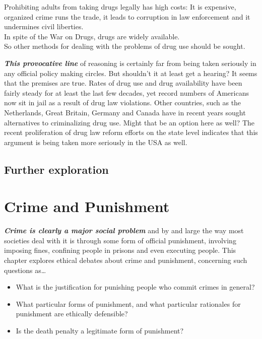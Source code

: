 \documentclass[
  12pt, openany]{book}
\makeatletter
\providecommand{\tightlist}{%
  \setlength{\itemsep}{0pt}\setlength{\parskip}{0pt}}
\newenvironment{kframe}{%
\medskip{}
\setlength{\fboxsep}{.8em}
 \def\at@end@of@kframe{}%
 \ifinner\ifhmode%
  \def\at@end@of@kframe{\end{minipage}}%
  \begin{minipage}{\columnwidth}%
 \fi\fi%
 \def\FrameCommand##1{\hskip\@totalleftmargin \hskip-\fboxsep
 \colorbox{shadecolor}{##1}\hskip-\fboxsep
     \hskip-\linewidth \hskip-\@totalleftmargin \hskip\columnwidth}%
 \MakeFramed {\advance\hsize-\width
   \@totalleftmargin\z@ \linewidth\hsize
   \@setminipage}}%
 {\par\unskip\endMakeFramed%
 \at@end@of@kframe}
\newenvironment{rmdblock}[1]
  {
  \begin{itemize}
  \renewcommand{\labelitemi}{
    \raisebox{-.7\height}[0pt][0pt]{
      {\setkeys{Gin}{width=3em,keepaspectratio}\texttt{[image: img/\#1]}}
    }
  }
  \setlength{\fboxsep}{1em}
  \begin{kframe}
  \item
  }
  {
  \end{kframe}
  \end{itemize}
  }
\newenvironment{question}
  {\begin{rmdblock}{question}}
  {\end{rmdblock}}
\theoremstyle{definition}
\theoremstyle{definition}
\theoremstyle{definition}
\theoremstyle{definition}
\theoremstyle{remark}
\makeatother
\begin{document}
\begin{center}

\begin{argument}
Prohibiting adults from taking drugs legally has high costs: It is expensive, organized crime runs the trade, it leads to corruption in law enforcement and it undermines civil liberties.\\
In spite of the War on Drugs, drugs are widely available.\\

So other methods for dealing with the problems of drug use should be sought.

\end{argument}


\end{center}

\textbf{\emph{This provocative line}} of reasoning is certainly far from being taken seriously in any official policy making circles. But shouldn't it at least get a hearing? It seems that the premises are true. Rates of drug use and drug availability have been fairly steady for at least the last few decades, yet record numbers of Americans now sit in jail as a result of drug law violations. Other countries, such as the Netherlands, Great Britain, Germany and Canada have in recent years sought alternatives to criminalizing drug use. Might that be an option here as well? The recent proliferation of drug law reform efforts on the state level indicates that this argument is being taken more seriously in the USA as well.

\hypertarget{further-exploration-8}{%
\section*{Further exploration}\label{further-exploration-8}}


\hypertarget{crime-and-punishment}{%
\chapter{Crime and Punishment}\label{crime-and-punishment}}

\textbf{\emph{Crime is clearly a major social problem}} and by and large the way most societies deal with it is through some form of official punishment, involving imposing fines, confining people in prisons and even executing people. This chapter explores ethical debates about crime and punishment, concerning such questions as\ldots{}

\begin{question}

\begin{itemize}
\tightlist
\item
  What is the justification for punishing people who commit crimes in general?
\item
  What particular forms of punishment, and what particular rationales for punishment are ethically defensible?
\item
  Is the death penalty a legitimate form of punishment?
\end{itemize}


\end{question}
\end{document}
